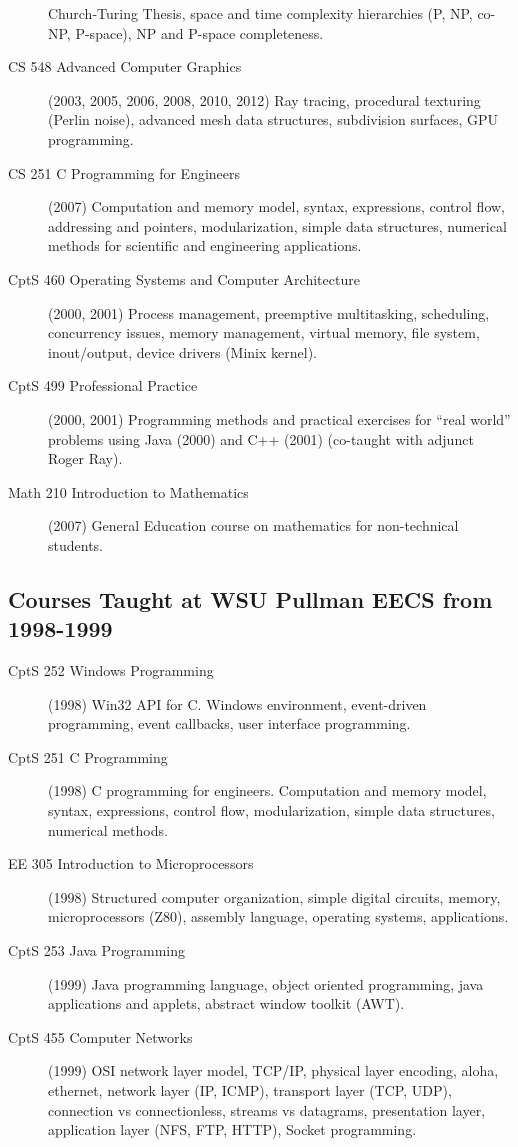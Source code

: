 \documentclass[10pt]{article}
\begin{document}
\begin{description}
      Church-Turing Thesis, space and time complexity hierarchies (P, NP, co-NP, P-space), NP and P-space
      completeness.
  \item[CS 548 Advanced Computer Graphics] (2003, 2005, 2006, 2008, 2010, 2012) Ray tracing, procedural 
      texturing (Perlin noise), advanced mesh data structures, subdivision surfaces, GPU programming.
  \item[CS 251 C Programming for Engineers] (2007) Computation and memory model,
    syntax, expressions, control flow, addressing and pointers, modularization, simple data structures, 
    numerical methods for scientific and engineering applications.
  \item[CptS 460 Operating Systems and Computer Architecture] (2000, 2001) Process management, 
     preemptive multitasking, scheduling, concurrency issues, memory management, virtual memory, file system,
     inout/output, device drivers (Minix kernel).
  \item[CptS 499 Professional Practice] (2000, 2001) Programming methods and practical exercises
     for ``real world'' problems using
     Java (2000) and C++ (2001) (co-taught with adjunct Roger Ray).
  \item[Math 210 Introduction to Mathematics] (2007) General Education course on mathematics for non-technical
     students.
\end{description}

\subsection*{Courses Taught at WSU Pullman EECS from 1998-1999}

\begin{description}
  \item[CptS 252 Windows Programming] (1998) Win32 API for C. Windows environment, event-driven programming,
     event callbacks, user interface programming.
  \item[CptS 251 C Programming] (1998) C programming for engineers. Computation and memory model,
    syntax, expressions, control flow, modularization, simple data structures, numerical methods.
  \item[EE 305 Introduction to Microprocessors] (1998) Structured computer organization, simple digital
     circuits, memory, microprocessors (Z80), assembly language, operating systems, applications.
  \item[CptS 253 Java Programming] (1999) Java programming language, object oriented programming,
     java applications and applets, abstract window toolkit (AWT).
  \item[CptS 455 Computer Networks] (1999) OSI network layer model, TCP/IP, physical layer encoding, 
      aloha, ethernet, network layer (IP, ICMP), transport layer (TCP, UDP), connection vs connectionless,
      streams vs datagrams, presentation layer, application layer (NFS, FTP, HTTP), Socket programming.
\end{description}
\end{document}
